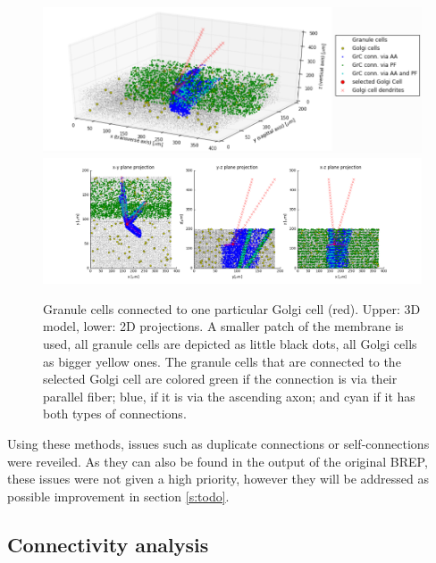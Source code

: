\documentclass[12pt]{report}
\begin{document}
\begin{figure}[h!]
\begin{minipage}[r]{16cm}
\vspace{0pt}
\centering
\includegraphics[width = 15cm]{./figures/gol_gran_allconn.png}
\includegraphics[width = 15cm]{./figures/gol_gran_allconn_proj.png}
\end{minipage}
\hfill
\caption{Granule cells connected to one particular Golgi cell (red). Upper: 3D model, lower: 2D projections. A smaller patch of the membrane is used, all granule cells are depicted as little black dots, all Golgi cells as bigger yellow ones. The granule cells that are connected to the selected Golgi cell are colored green if the connection is via their parallel fiber; blue, if it is via the ascending axon; and cyan if it has both types of connections.}
\label{f:pf_gol_conn}
\end{figure}


Using these methods, issues such as duplicate connections or self-connections were reveiled. As they can also be found in the output of the original BREP, these issues were not given a high priority, however they will be addressed as possible improvement in section \ref{s:todo}.


\subsection{Connectivity analysis}
\label{s:conn_an}
\end{document}
